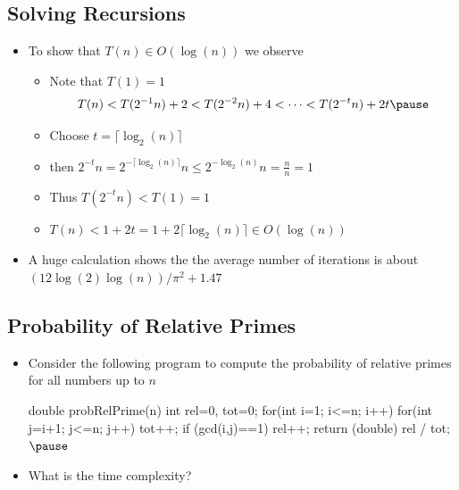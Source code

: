 \begin{slide}
\section[-1]{Solving Recursions}

\begin{PauseHighLight}
  \begin{itemize}
  \item To show that $T(n)\in O(\log(n))$ we observe
    \begin{itemize}
    \item Note that $T(1) = 1$\pause
      \begin{align*}
        T(n) < T(2^{-1}n)+2 < T(2^{-2}n)+4 < \cdots < T(2^{-t}n) + 2t\pause
      \end{align*}
    \item Choose $t=\lceil \log_2(n)  \rceil$
    \item then $2^{-t}n = 2^{-\lceil \log_2(n)  \rceil}n\leq
      2^{-\log_2(n)} n = \frac{n}{n} = 1$\pause 
    \item Thus $T(2^{-t}n)< T(1) = 1$\pause
    \item $T(n) < 1 + 2 t = 1 +  2 \lceil \log_2(n)  \rceil \in
      O(\log(n))$\pause
    \end{itemize}
  \item A huge calculation shows the the average number of iterations is
    about $(12 \log(2) \log(n))/\pi^2 + 1.47$\pause
  \end{itemize}
\end{PauseHighLight}

\end{slide}


\begin{slide}
\section[-1]{Probability of Relative Primes}

\begin{PauseHighLight}
  \begin{itemize}
  \item Consider the following program to compute the probability of
    relative primes for all numbers up to $n$
\begin{java}
double probRelPrime(n)
{
  int rel=0, tot=0;
  for(int i=1; i<=n; i++)
     for(int j=i+1; j<=n; j++) {
       tot++;
       if (gcd(i,j)==1)
          rel++;
     }
  return (double) rel / tot;
} $\pause$
\end{java}
\item What is the time complexity?\pause
  \end{itemize}
\end{PauseHighLight}

\end{slide}

